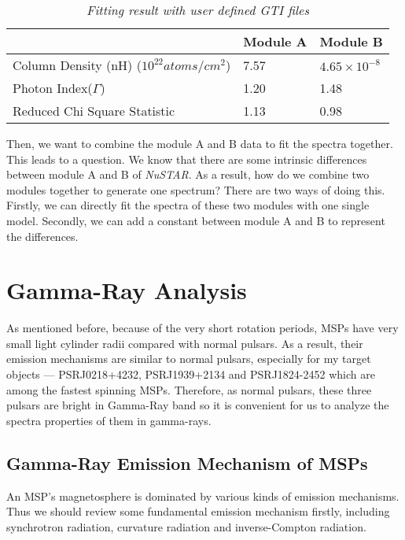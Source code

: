 \documentclass[12pt]{report}
\newcommand{\mycaption}[1]{\caption{\textit{\footnotesize #1}}}
\begin{document}
          \begin{table}[!h]   
            \centering
            \begin{tabular}{| m{4cm} | m{3cm} | m{3cm} |}
              \hline
              & Module A & Module B\\
              \hline
              Column Density (nH) ($10^{22} atoms/cm^2$) & 7.57 & $4.65\times10^{-8}$\\ 
              \hline
              Photon Index($\Gamma$) & 1.20 & 1.48 \\
              \hline 
              Reduced Chi Square Statistic & 1.13 & 0.98 \\
              \hline 
            \end{tabular}
            \mycaption{Fitting result with user defined GTI files}
            \label{table:spectra_usrgti}
          \end{table}

          Then, we want to combine the module A and B data to fit the spectra together. This leads to a question.
          We know that there are some intrinsic differences between module A and B of \textit{NuSTAR}. As a result,
          how do we combine two modules together to generate one spectrum? There are two ways of doing this. Firstly,
          we can directly fit the spectra of these two modules with one single model. Secondly, we can add a 
          constant between module A and B to represent the differences. %


  \chapter{Gamma-Ray Analysis}
      As mentioned before, because of the very short rotation periods, MSPs have very small light cylinder radii 
      compared with normal pulsars. As a result, their emission mechanisms are similar to normal pulsars, 
      especially for my target objects --- PSRJ0218+4232, PSRJ1939+2134 and PSRJ1824-2452
      which are among the fastest spinning MSPs. Therefore, as normal pulsars, these three 
      pulsars are bright in Gamma-Ray band so it is convenient for us to analyze the spectra 
      properties of them in gamma-rays.


      \section{Gamma-Ray Emission Mechanism of MSPs}
        An MSP's magnetosphere is dominated by various kinds of emission mechanisms. Thus we should review some 
        fundamental emission mechanism firstly, including synchrotron radiation, curvature radiation and 
        inverse-Compton radiation.
        
\end{document}
